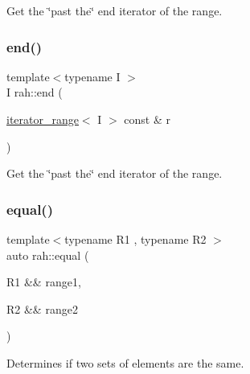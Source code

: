 Get the \char`\"{}past the\char`\"{} end iterator of the range. 

\mbox{\label{namespacerah_a6b31fe80bf81abf3149df010cb265e20}} 
\subsubsection{\texorpdfstring{end()}{end()}\hspace{0.1cm}{\footnotesize\ttfamily [2/2]}}
{\footnotesize\ttfamily template$<$typename I $>$ \\
I rah\+::end (\begin{DoxyParamCaption}\item[{\mbox{\hyperlink{structrah_1_1iterator__range}{iterator\+\_\+range}}$<$ I $>$ const \&}]{r }\end{DoxyParamCaption})}



Get the \char`\"{}past the\char`\"{} end iterator of the range. 

\mbox{\label{namespacerah_abf321dffb33d6a2d752aa091fdba7bbf}} 
\subsubsection{\texorpdfstring{equal()}{equal()}\hspace{0.1cm}{\footnotesize\ttfamily [1/2]}}
{\footnotesize\ttfamily template$<$typename R1 , typename R2 $>$ \\
auto rah\+::equal (\begin{DoxyParamCaption}\item[{R1 \&\&}]{range1,  }\item[{R2 \&\&}]{range2 }\end{DoxyParamCaption})}



Determines if two sets of elements are the same. 


\begin{DoxyCodeInclude}{0}
\end{DoxyCodeInclude}
\mbox{\label{namespacerah_a3434aacc26937d3ff50b5db4286feda6}} 
